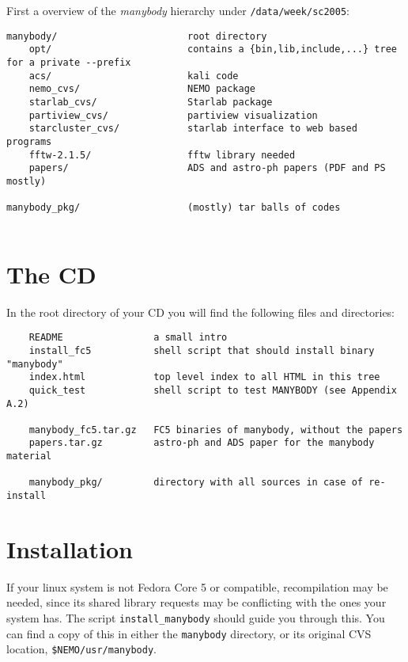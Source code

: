 First a overview of the {\it manybody} hierarchy under {\tt /data/week/sc2005}:

\footnotesize
\begin{verbatim}
manybody/                       root directory
    opt/                        contains a {bin,lib,include,...} tree for a private --prefix
    acs/                        kali code
    nemo_cvs/                   NEMO package
    starlab_cvs/                Starlab package
    partiview_cvs/              partiview visualization 
    starcluster_cvs/            starlab interface to web based programs
    fftw-2.1.5/                 fftw library needed 
    papers/                     ADS and astro-ph papers (PDF and PS mostly)

manybody_pkg/                   (mostly) tar balls of codes 
    
\end{verbatim}
\normalsize



\section{The CD}
In the root directory of your CD you will find the following files and directories:

\begin{verbatim}
    README                a small intro
    install_fc5           shell script that should install binary "manybody"
    index.html            top level index to all HTML in this tree
    quick_test            shell script to test MANYBODY (see Appendix A.2)

    manybody_fc5.tar.gz   FC5 binaries of manybody, without the papers
    papers.tar.gz         astro-ph and ADS paper for the manybody material

    manybody_pkg/         directory with all sources in case of re-install
\end{verbatim}

\section{Installation}

If your linux system is not Fedora Core 5
or compatible, recompilation may be needed, since its shared library requests
may be conflicting with the ones your system has.
The script
{\tt install\_manybody} should guide you through this. You can find a copy
of this in either the {\tt manybody} directory, or its original CVS location,
{\tt \$NEMO/usr/manybody}.

